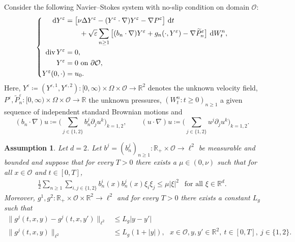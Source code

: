 \documentclass{amsart}
\renewcommand{\O}{\Omega}
\renewcommand{\div}{\normalfont{\text{div}}}
\newcommand{\wt}{\widetilde}
\newcommand{\Dom}{\mathcal{O}}
\newcommand{\dd}{\,\mathrm{d}}
\newcommand{\<}{\langle}
\newcommand{\?}{\rangle}
\theoremstyle{plain}
\theoremstyle{remark}
\theoremstyle{plain}
\newtheorem{assumption}[theorem]{Assumption}
\numberwithin{equation}{section}
\def\R{{\mathbb R}}
\begin{document}
Consider the following Navier--Stokes system with no-slip condition on domain $\Dom$:
\begin{equation}
\label{eq:Navier_Stokes}
\left\{
\begin{aligned}
\dd Y^{\varepsilon} &=\big[\nu \Delta Y^{\varepsilon} -(Y^{\varepsilon}\cdot \nabla)Y^{\varepsilon} -\nabla P^{\varepsilon}  \big] \,\dd  t
\\ & \qquad +\sqrt{\varepsilon} \sum_{n\geq 1}\big[(b_{n}\cdot\nabla) Y^{\varepsilon} +g_n(\cdot,Y^{\varepsilon}) -\nabla \wt{P}_n^{\varepsilon}\big] \,\dd W_t^n,
\\
\div \,Y^{\varepsilon}&=0,
\\ Y^{\varepsilon}&=0 \ \text{on $\partial \Dom$},
\\ Y^{\varepsilon}(0,\cdot)&=u_0.
\end{aligned}\right.
\end{equation}
Here, $Y^{\varepsilon}\coloneqq(Y^{\varepsilon,1},Y^{\varepsilon,2})\colon[0,\infty)\times \O\times \Dom\to \R^2$ denotes the unknown velocity field, $P^{\varepsilon},\wt{P}_n^{\varepsilon}\colon[0,\infty)\times \O\times \Dom\to \R$ the unknown pressures, $(W_t^n:t\geq 0)_{n\geq 1}$ a given sequence of independent standard Brownian motions and
\begin{equation*}
(b_{n}\cdot\nabla) u\coloneqq\Big(\sum_{j\in \{1,2\}} b_n^j \partial_j u^k\Big)_{k=1,2},
\qquad (u\cdot \nabla ) u\coloneqq\Big(\sum_{j\in \{1,2\}} u^j \partial_j u^k\Big)_{k=1,2}.
\end{equation*}

\begin{assumption}\label{ass:SNS}
Let $d=2$. Let $b^j = (b^j_{n})_{n\geq 1}:\R_+\times \Dom\to \ell^2$ be measurable and bounded and suppose that for every $T>0$ there exists a $\mu\in (0,\nu)$
such that for all $x\in \Dom$ and $t\in [0,T]$, 
\begin{align*}
\frac{1}{2}\sum_{n\geq 1} \sum_{i,j\in \{1,2\}} b_n^i(x) b_n^j(x) \xi_i \xi_j \leq \mu |\xi|^2 \ \ \text{ for all }\xi\in \R^d.
\end{align*}
Moreover, $g^1, g^2\colon\R_+\times\Dom\times\R^2\to \ell^2$ and for every $T>0$ there exists a constant $L_g$ such that
\begin{align*}
\|g^j(t,x,y) - g^j(t,x,y')\|_{\ell^2}&\leq L_g |y-y'| \\ 
\|g^j (t,x,y)\|_{\ell^2}& \leq L_g(1+|y|), \ \ \ x\in \Dom, y,y'\in \R^2, \ t\in [0,T], \ j\in \{1, 2\}.  
\end{align*}
\end{assumption}
\end{document}
